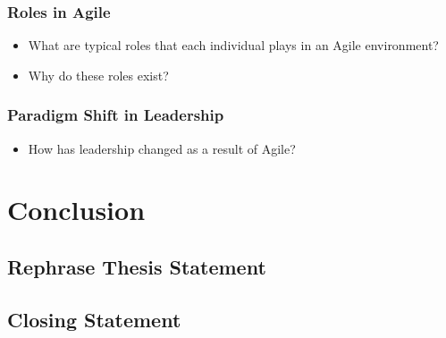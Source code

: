 \documentclass[11pt,a4paper]{article}
\begin{document}
		\subsubsection{Roles in Agile}
		\begin{itemize}[noitemsep]
			\item What are typical roles that each individual plays in an Agile environment? 
			\item Why do these roles exist?
		\end{itemize}
		\subsubsection{Paradigm Shift in Leadership}
		\begin{itemize}[noitemsep]
			\item How has leadership changed as a result of Agile?
		\end{itemize}

\section{Conclusion}
	\subsection{Rephrase Thesis Statement}
	\subsection{Closing Statement}

\newpage
\end{document}
